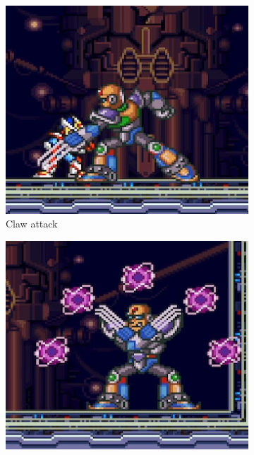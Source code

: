 \begin{figure}[htp]
	\centering
	\begin{minipage}{0.3\linewidth}		
		\begin{subfigure}{\linewidth}
			\centering
			\includegraphics[width=\linewidth]{figures/X2/Hunter_stages/Sigma_claw.png}
			\caption{Claw attack}	
		\end{subfigure}
		\begin{subfigure}{\linewidth}
			\centering
			\includegraphics[width=\linewidth]{figures/X2/Hunter_stages/Sigma_spark.png}

\end{subfigure}
\end{minipage}
\end{figure}
